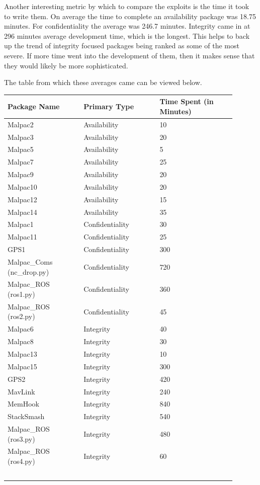 \documentclass[IEEEtran,letterpaper,10pt,notitlepage,draftclsnofoot]{article}
\begin{document}
Another interesting metric by which to compare the exploits is the time it took to write them.
On average the time to complete an availability package was 18.75 minutes.
For confidentiality the average was 246.7 minutes.
Integrity came in at 296 minutes average development time, which is the longest.
This helps to back up the trend of integrity focused packages being ranked as some of the most severe.
If more time went into the development of them, then it makes sense that they would likely be more sophisticated.

The table from which these averages came can be viewed below.

\begin{center}
\begin{tabular}{ |p{0.3\linewidth}|p{0.3\linewidth}|p{0.3\linewidth}| }
\hline
    Package Name & Primary Type & Time Spent (in Minutes) \\ \hline
    Malpac2 & Availability & 10 \\ \hline
    Malpac3 & Availability & 20 \\ \hline
    Malpac5 & Availability & 5 \\ \hline
    Malpac7 & Availability & 25 \\ \hline
    Malpac9 & Availability & 20 \\ \hline
    Malpac10 & Availability & 20 \\ \hline
    Malpac12 & Availability & 15 \\ \hline
    Malpac14 & Availability & 35 \\ \hline
    Malpac1 & Confidentiality & 30 \\ \hline
    Malpac11 & Confidentiality & 25 \\ \hline
    GPS1 & Confidentiality & 300 \\ \hline
    Malpac\_Coms (nc\_drop.py) & Confidentiality & 720 \\ \hline
    Malpac\_ROS (ros1.py) & Confidentiality & 360 \\ \hline
    Malpac\_ROS (ros2.py) & Confidentiality & 45 \\ \hline
    Malpac6 & Integrity & 40 \\ \hline
    Malpac8 & Integrity & 30 \\ \hline
    Malpac13 & Integrity & 10 \\ \hline
    Malpac15 & Integrity & 300 \\ \hline
    GPS2 & Integrity & 420 \\ \hline
    MavLink & Integrity & 240 \\ \hline
    MemHook & Integrity & 840 \\ \hline
    StackSmash & Integrity & 540 \\ \hline
    Malpac\_ROS (ros3.py) & Integrity & 480 \\ \hline
    Malpac\_ROS (ros4.py) & Integrity & 60 \\ \hline
     &  & \  \\ \hline
\end{tabular}
\end{center} 
\end{document}
